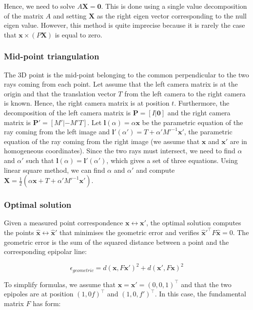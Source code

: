 \documentclass[11pt]{report}
\begin{document}
Hence, we need to solve $A\mathbf{X} = \mathbf{0}$. This is done using a single value decomposition of the matrix $A$ and setting $\mathbf{X}$ as the right eigen vector corresponding to the null eigen value.
However, this method is quite imprecise because it is rarely the case that $\mathbf{x} \times (P\mathbf{X})$ is equal to zero. 

\subsubsection{Mid-point triangulation \cite{Hartley96triangulation}} 

The 3D point is the mid-point belonging to the common perpendicular to the two rays coming from each point. Let assume that the left camera matrix is at the origin and that the translation vector $T$ from the left camera to the right camera is known. Hence, the right camera matrix is at position $t$. Furthermore, the decomposition of the left camera matrix is $\mathbf{P} = [I|\mathbf{0}]$ and the right camera matrix is $\mathbf{P}' = [M' | -M'T]$. Let $\mathbf{l}(\alpha) = \alpha\mathbf{x}$ be the parametric equation of the ray coming from the left image and $\mathbf{l}'(\alpha') = T + \alpha' M'^{-1}\mathbf{x}'$, the parametric equation of the ray coming from the right image (we assume that $\mathbf{x}$ and $\mathbf{x}'$ are in homogeneous coordinates). Since the two rays must intersect, we need to find $\alpha$ and $\alpha'$ such that $\mathbf{l}(\alpha) = \mathbf{l}'(\alpha')$, which gives a set of three equations. Using linear square method, we can find $\alpha$ and $\alpha'$ and compute $\mathbf{X} = \frac{1}{2} (\alpha \mathbf{x} + T + \alpha' M'^{-1} \mathbf{x}')$.

\subsubsection{Optimal solution}

Given a measured point correspondence $\mathbf{x} \leftrightarrow \mathbf{x}'$, the optimal solution computes the points $\hat{\mathbf{x}} \leftrightarrow \hat{\mathbf{x}}'$ that minimises the geometric error and verifies $\hat{\mathbf{x}}'^{\top}F\hat{\mathbf{x}} = 0$. The geometric error is the sum of the squared distance between a point and the corresponding epipolar line:

\[
 \epsilon_{geometric} = d(\mathbf{x}, F\mathbf{x}')^2 + d(\mathbf{x}', F\mathbf{x})^2
\]

To simplify formulas, we assume that $\mathbf{x} = \mathbf{x}' = (0, 0, 1)^\top$ and that the two epipoles are at position $(1, 0 f)^\top$ and $(1, 0, f')^\top$. In this case, the fundamental matrix $F$ has form:
\end{document}
